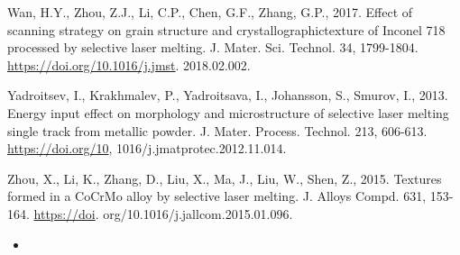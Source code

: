 \documentclass[10pt]{article}
\begin{document}
Wan, H.Y., Zhou, Z.J., Li, C.P., Chen, G.F., Zhang, G.P., 2017. Effect of scanning strategy on grain structure and crystallographictexture of Inconel 718 processed by selective laser melting. J. Mater. Sci. Technol. 34, 1799-1804. \href{https://doi.org/10.1016/j.jmst}{https://doi.org/10.1016/j.jmst}. 2018.02.002.

Yadroitsev, I., Krakhmalev, P., Yadroitsava, I., Johansson, S., Smurov, I., 2013. Energy input effect on morphology and microstructure of selective laser melting single track from metallic powder. J. Mater. Process. Technol. 213, 606-613. \href{https://doi.org/10}{https://doi.org/10}, 1016/j.jmatprotec.2012.11.014.

Zhou, X., Li, K., Zhang, D., Liu, X., Ma, J., Liu, W., Shen, Z., 2015. Textures formed in a CoCrMo alloy by selective laser melting. J. Alloys Compd. 631, 153-164. \href{https://doi}{https://doi}. org/10.1016/j.jallcom.2015.01.096.

\begin{itemize}
  \item 
\end{itemize}
\end{document}
